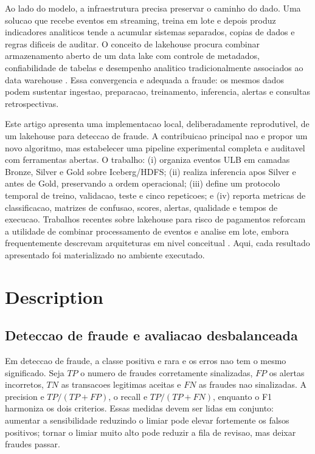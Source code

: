 \documentclass[10pt,twocolumn]{article}
\begin{document}
Ao lado do modelo, a infraestrutura precisa preservar o caminho do dado. Uma solucao que recebe eventos em streaming, treina em lote e depois produz indicadores analiticos tende a acumular sistemas separados, copias de dados e regras dificeis de auditar. O conceito de lakehouse procura combinar armazenamento aberto de um data lake com controle de metadados, confiabilidade de tabelas e desempenho analitico tradicionalmente associados ao data warehouse \cite{armbrust2021}. Essa convergencia e adequada a fraude: os mesmos dados podem sustentar ingestao, preparacao, treinamento, inferencia, alertas e consultas retrospectivas.

Este artigo apresenta uma implementacao local, deliberadamente reprodutivel, de um lakehouse para deteccao de fraude. A contribuicao principal nao e propor um novo algoritmo, mas estabelecer uma pipeline experimental completa e auditavel com ferramentas abertas. O trabalho: (i) organiza eventos ULB em camadas Bronze, Silver e Gold sobre Iceberg/HDFS; (ii) realiza inferencia apos Silver e antes de Gold, preservando a ordem operacional; (iii) define um protocolo temporal de treino, validacao, teste e cinco repeticoes; e (iv) reporta metricas de classificacao, matrizes de confusao, scores, alertas, qualidade e tempos de execucao. Trabalhos recentes sobre lakehouse para risco de pagamentos reforcam a utilidade de combinar processamento de eventos e analise em lote, embora frequentemente descrevam arquiteturas em nivel conceitual \cite{battapothu2025,carrington2025,adlermann2024}. Aqui, cada resultado apresentado foi materializado no ambiente executado.

\section{Description} \label{sec:firstpage}

\subsection{Deteccao de fraude e avaliacao desbalanceada}

Em deteccao de fraude, a classe positiva e rara e os erros nao tem o mesmo significado. Seja $TP$ o numero de fraudes corretamente sinalizadas, $FP$ os alertas incorretos, $TN$ as transacoes legitimas aceitas e $FN$ as fraudes nao sinalizadas. A precision e $TP/(TP+FP)$, o recall e $TP/(TP+FN)$, enquanto o F1 harmoniza os dois criterios. Essas medidas devem ser lidas em conjunto: aumentar a sensibilidade reduzindo o limiar pode elevar fortemente os falsos positivos; tornar o limiar muito alto pode reduzir a fila de revisao, mas deixar fraudes passar.
\end{document}
